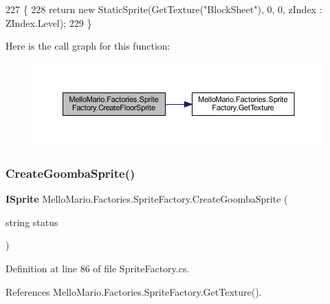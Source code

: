 \begin{DoxyCode}
227         \{
228             \textcolor{keywordflow}{return} \textcolor{keyword}{new} StaticSprite(GetTexture(\textcolor{stringliteral}{"BlockSheet"}), 0, 0, zIndex : 
      ZIndex.Level);
229         \}
\end{DoxyCode}
Here is the call graph for this function\+:
\nopagebreak
\begin{figure}[H]
\begin{center}
\leavevmode
\includegraphics[width=350pt]{classMelloMario_1_1Factories_1_1SpriteFactory_a6797aa2f76dd8986f7b8bc49f6e8e96f_cgraph}
\end{center}
\end{figure}
\mbox{\label{classMelloMario_1_1Factories_1_1SpriteFactory_ae439b845459af63cdb3cee8f2aaba55b}} 
\subsubsection{Create\+Goomba\+Sprite()}
{\footnotesize\ttfamily \textbf{ I\+Sprite} Mello\+Mario.\+Factories.\+Sprite\+Factory.\+Create\+Goomba\+Sprite (\begin{DoxyParamCaption}\item[{string}]{status }\end{DoxyParamCaption})}



Definition at line 86 of file Sprite\+Factory.\+cs.



References Mello\+Mario.\+Factories.\+Sprite\+Factory.\+Get\+Texture().


